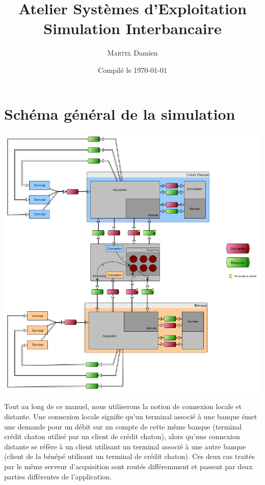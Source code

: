 \documentclass[french, a4paper, 12pt, titlepage]{article}
\begin{document}
\title{Atelier Systèmes d'Exploitation\\Simulation Interbancaire}
\author{\textsc{Martel} Damien}
\date{Compilé le \today}

\maketitle

\vfill
\pagebreak

\newpage
\strut\thispagestyle{empty}
\vfill
\pagebreak
\tableofcontents
\strut\thispagestyle{empty}
\newpage
\setcounter{page}{1}

\section{Schéma général de la simulation}
\medskip
\begin{center}
\includegraphics[scale=0.5]{global}
\end{center}
\medskip

Tout au long de ce manuel, nous utiliserons la notion de connexion locale et distante.
Une connexion locale signifie qu'un terminal associé à une banque émet une demande pour un débit sur un compte de cette même banque (terminal crédit chaton utilisé par un client de crédit chaton), alors qu'une connexion distante se réfère à un client utilisant un terminal associé à une autre banque (client de la bénépé utilisant un terminal de crédit chaton).
Ces deux cas traités par le même serveur d'acquisition sont routés différemment et passent par deux parties différentes de l'application.
\end{document}
